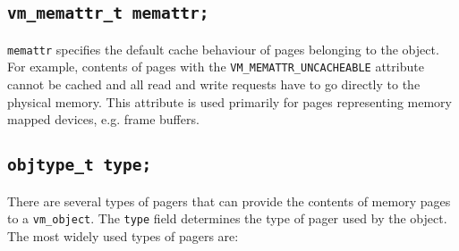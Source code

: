 \documentclass[shortabstract, english]{iithesis}
\begin{document}
\subsection*{\texttt{vm_memattr_t memattr;}}

\texttt{memattr} specifies the default cache behaviour of pages belonging
to the object. For example, contents of pages with the
\texttt{VM_MEMATTR_UNCACHEABLE} attribute cannot be cached and all read
and write requests have to go directly to the physical memory. This attribute is used
primarily for pages representing memory mapped devices, e.g. frame buffers.

\subsection*{\texttt{objtype_t type;}}

There are several types of pagers that can provide the contents of memory pages
to a \texttt{vm_object}. The \texttt{type} field determines the
type of pager used by the object. The most widely used types of pagers are:
\end{document}
